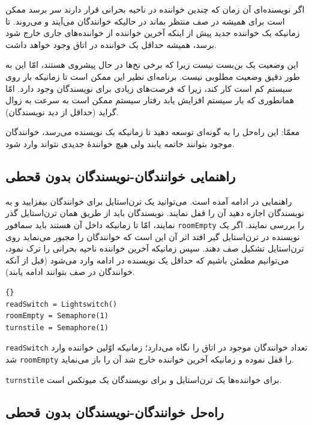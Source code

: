 \documentclass{book}
\newcommand{\clearemptydoublepage}{}%
\begin{document}
    اگر نویسنده‌ای آن زمان که چندین خواننده در ناحیه بحرانی قرار دارند سر برسد ممکن است برای همیشه در صف منتظر بماند در حالیکه خوانندگان 
    می‌آیند و می‌روند. تا زمانیکه یک خواننده جدید پیش از اینکه آخرین خواننده از خواننده‌های جاری خارج شود برسد، همیشه حداقل یک خواننده در اتاق 
    وجود خواهد داشت. 
    
    این وضعیت یک بن‌بست نیست زیرا که برخی نخ‌ها در حال پیشروی هستند، امّا این به طور دقیق وضعیت مطلوبی نیست. 
    برنامه‌ای نظیر این ممکن است تا زمانیکه بار روی سیستم کم است کار کند، زیرا که فرصت‌های زیادی برای نویسندگان وجود دارد. 
    امّا همانطوری که بار سیستم افزایش یابد رفتار سیستم ممکن است به سرعت به زوال گراید (حداقل از دید نویسندگان). 

    معمّا: این راه‌حل را به گونه‌ای توسعه دهید تا زمانیکه یک نویسنده می‌رسد، خوانندگان موجود بتوانند خاتمه یابند ولی هیچ خوانندهٔ جدیدی نتواند وارد شود. 


\clearemptydoublepage
\subsection {راهنمایی خوانندگان-نویسندگان بدون قحطی}  

    راهنمایی در ادامه آمده است. می‌توانید یک ترن‌استایل برای خوانندگان بیفزایید و به نویسندگان اجازه دهید آن را قفل نمایند. 
    نویسندگان باید از طریق همان ترن‌استایل گذر نمایند، امّا تا زمانیکه داخل آن هستند باید سمافور {\tt roomEmpty} را بررسی نمایند. 
    اگر یک نویسنده در ترن‌استایل گیر افتد اثر آن این است که خوانندگان را مجبور می‌نماید روی ترن‌استایل تشکیل صف دهند. سپس زمانیکه آخرین 
    خواننده ناحیه بحرانی را ترک نمود، می‌توانیم مطمئن باشیم که حداقل یک نویسنده در ادامه وارد می‌شود (قبل از آنکه خوانندگان در صف بتوانند ادامه یابند).

\begin{latin}
\begin{lstlisting}[title=\rl{مقدار دهی اولیه خوانندگان-نویسندگان بدون قحطی}]{}
readSwitch = Lightswitch()
roomEmpty = Semaphore(1)
turnstile = Semaphore(1)
\end{lstlisting}
\end{latin}

    {\tt readSwitch} 
    تعداد خوانندگان موجود در اتاق را نگاه می‌دارد؛ زمانیکه اوّلین خواننده وارد شد  {\tt roomEmpty} را قفل نموده و زمانیکه آخرین خواننده خارج شد 
    آن را باز می‌نماید. 

    {\tt turnstile}
    برای خواننده‌ها یک ترن‌استایل  و برای نویسندگان یک میوتکس است. 


\clearemptydoublepage
\subsection{راه‌حل خوانندگان-نویسندگان بدون قحطی}  
\end{document}
